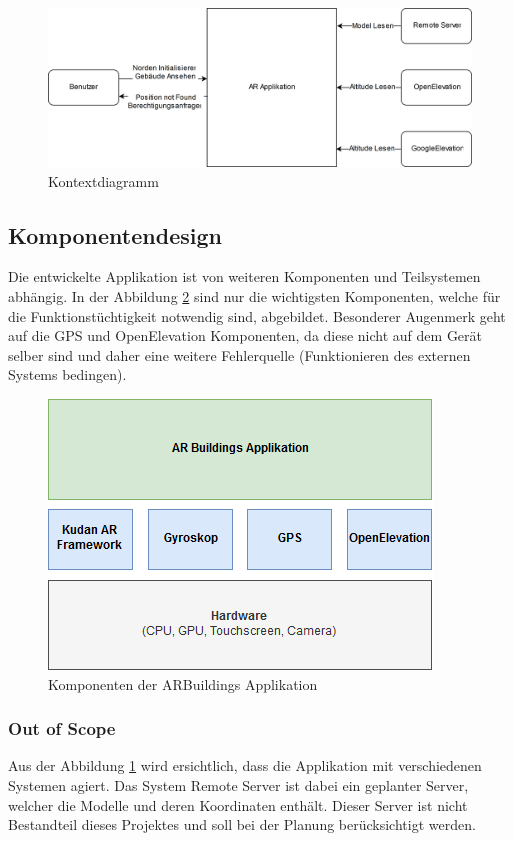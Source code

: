 \documentclass[a4paper]{scrreprt}
\begin{document}
\begin{figure}[h!]
	\includegraphics[keepaspectratio, width=\textwidth]{KontextDiagram.png}
	\caption{Kontextdiagramm}
	\label{fig:Kontext}
\end{figure}

\clearpage

\subsection{Komponentendesign}

Die entwickelte Applikation ist von weiteren Komponenten und Teilsystemen abhängig. In der Abbildung \ref{fig:Komponentendesign} sind nur die wichtigsten Komponenten, welche für die Funktionstüchtigkeit notwendig sind, abgebildet.
\bigbreak
Besonderer Augenmerk geht auf die GPS und OpenElevation Komponenten, da diese nicht auf dem Gerät selber sind und daher eine weitere Fehlerquelle (Funktionieren des externen Systems bedingen).

\begin{figure}[h!]
	\centering
	\includegraphics[width=0.7\linewidth, keepaspectratio]{Komponentendesign}
	\caption{Komponenten der ARBuildings Applikation}
	\label{fig:Komponentendesign}
\end{figure}

\subsubsection{Out of Scope}
\label{ssec:outOfScope}
Aus der Abbildung \ref{fig:Kontext} wird ersichtlich, dass die Applikation mit verschiedenen Systemen agiert. Das System Remote Server ist dabei ein geplanter Server, welcher die Modelle und deren Koordinaten enthält. Dieser Server ist nicht Bestandteil dieses Projektes und soll bei der Planung berücksichtigt werden.
\end{document}
